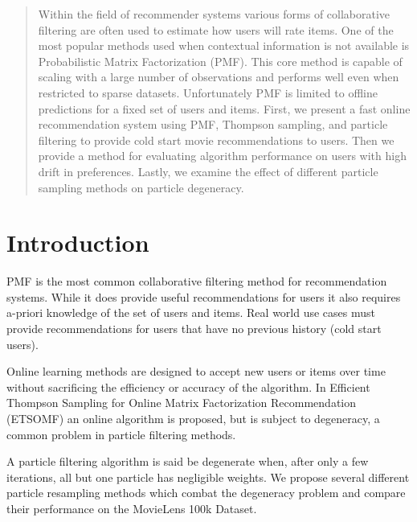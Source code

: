 \documentclass{article}
\begin{document}

\begin{abstract}
    Within the field of recommender systems various forms of collaborative filtering are often used to estimate how users will rate items. One of the most popular methods used when contextual information is not available is Probabilistic Matrix Factorization (PMF). This core method is capable of scaling with a large number of observations and performs well even when restricted to sparse datasets. Unfortunately PMF is limited to offline predictions for a fixed set of users and items. First, we present a fast online recommendation system using PMF, Thompson sampling, and particle filtering to provide cold start movie recommendations to users. Then we provide a method for evaluating algorithm performance on users with high drift in preferences. Lastly, we examine the effect of different particle sampling methods on particle degeneracy.
\end{abstract}

\section{Introduction}
PMF is the most common collaborative filtering method for recommendation systems. While it does provide useful recommendations for users it also requires a-priori knowledge of the set of users and items. Real world use cases must provide recommendations for users that have no previous history (cold start users). 

Online learning methods are designed to accept new users or items over time without sacrificing the efficiency or accuracy of the algorithm. In Efficient Thompson Sampling for Online Matrix Factorization Recommendation \cite{kawale2015efficient} (ETSOMF) an online algorithm is proposed, but is subject to degeneracy, a common problem in particle filtering methods.

A particle filtering algorithm is said be degenerate when, after only a few iterations, all but one particle has negligible weights. We propose several different particle resampling methods which combat the degeneracy problem and compare their performance on the MovieLens 100k Dataset.
\end{document}
